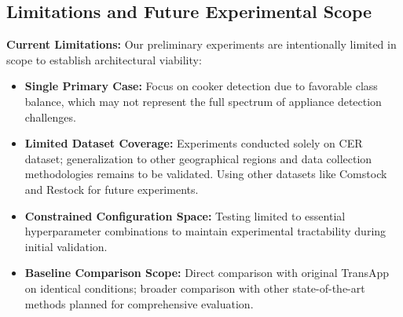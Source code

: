 \documentclass[conference]{IEEEtran}
\begin{document}




\subsection{Limitations and Future Experimental Scope}

\textbf{Current Limitations:} Our preliminary experiments are intentionally limited in scope to establish architectural viability:

\begin{itemize}
    \item \textbf{Single Primary Case:} Focus on cooker detection due to favorable class balance, which may not represent the full spectrum of appliance detection challenges.
    
    \item \textbf{Limited Dataset Coverage:} Experiments conducted solely on CER dataset; generalization to other geographical regions and data collection methodologies remains to be validated. Using other datasets like Comstock and Restock for future experiments.
    
    \item \textbf{Constrained Configuration Space:} Testing limited to essential hyperparameter combinations to maintain experimental tractability during initial validation.
    
    \item \textbf{Baseline Comparison Scope:} Direct comparison with original TransApp on identical conditions; broader comparison with other state-of-the-art methods planned for comprehensive evaluation.
\end{itemize}
\end{document}
